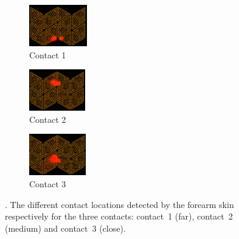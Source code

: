 	\begin{figure}[t]
		\centering
		\begin{subfigure}[t]{0.30\hsize}
        \centering
			\includegraphics[height=1.8cm]{robertoICRA/fig/paris2_new} 
			\caption{Contact 1}
		\end{subfigure}
		\hspace{0.1cm}
		\begin{subfigure}[t]{0.30\hsize}
        \centering
			\includegraphics[height=1.8cm]{robertoICRA/fig/paris3_new} 
			\caption{Contact 2}
		\end{subfigure}
		\hspace{0.1cm}
		\begin{subfigure}[t]{0.30\hsize}
        \centering
			\includegraphics[height=1.8cm]{robertoICRA/fig/paris7_new}
			\caption{Contact 3}
		\end{subfigure}
		\caption{\textbf{}. The different contact locations detected by the forearm skin respectively for the three contacts: contact~1 (far), contact~2 (medium) and contact~3 (close).}
		\label{fig:exp2:skin}
        \figspace
	\end{figure}

